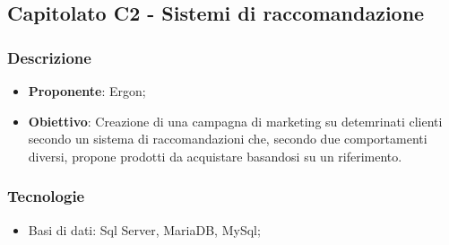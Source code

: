 \subsection{Capitolato C2 - Sistemi di raccomandazione}


\subsubsection{Descrizione}
\begin{itemize}
    \item \textbf{Proponente}: Ergon;
    \item \textbf{Obiettivo}: Creazione di una campagna di marketing su detemrinati clienti secondo un sistema di raccomandazioni che, secondo due comportamenti diversi, propone prodotti da acquistare basandosi su un riferimento.
\end{itemize}


\subsubsection{Tecnologie}
\begin{itemize}
    \item Basi di dati: Sql Server, MariaDB, MySql;
\end{itemize}


